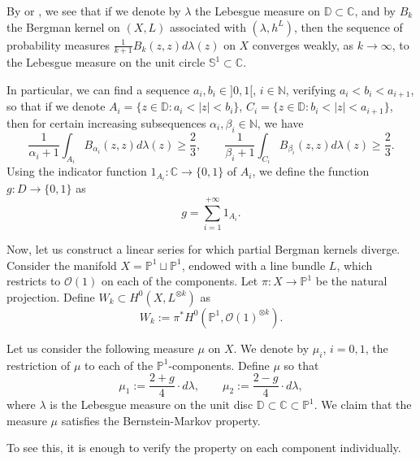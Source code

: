\documentclass[12pt]{article}
\numberwithin{equation}{section}
\theoremstyle{theorem}
\theoremstyle{definition}
\theoremstyle{remark}
\newcommand{\comp}{\mathbb{C}}
\newcommand{\nat}{\mathbb{N}}
\begin{document}
	By \cite{BloomLeven1} or \cite{BerBoucNys}, we see that if we denote by $\lambda$ the Lebesgue measure on $\mathbb{D} \subset \comp$, and by $B_k$ the Bergman kernel on $(X, L)$ associated with $(\lambda, h^L)$, then the sequence of probability measures $\frac{1}{k + 1} B_k(z,z) d \lambda(z)$ on $X$ converges weakly, as $k \to \infty$, to the Lebesgue measure on the unit circle $\mathbb{S}^1 \subset \comp$.
	\par 
	In particular, we can find a sequence $a_i, b_i \in ]0, 1[$, $i \in \nat$, verifying $a_i < b_i < a_{i + 1}$, so that if we denote $A_i = \{ z \in \mathbb{D}: a_i < |z| < b_i \}$, $C_i = \{ z \in \mathbb{D}: b_i < |z| < a_{i + 1} \}$, then for certain increasing subsequences $\alpha_i, \beta_i \in \nat$, we have
	\begin{equation}
		\frac{1}{\alpha_i + 1}
		\int_{A_i} B_{\alpha_i}(z,z) d \lambda(z) \geq \frac{2}{3},
		\qquad 
		\frac{1}{\beta_i + 1}
		\int_{C_i} B_{\beta_i}(z,z) d \lambda(z) \geq \frac{2}{3}.
	\end{equation}
	Using the indicator function $1_{A_i} : \comp \to \{0, 1\}$ of $A_i$, we define the function $g : D \to \{0, 1\}$ as 
	\begin{equation}
		g = \sum_{i = 1}^{+\infty} 1_{A_i}.
	\end{equation}
	\par 
	Now, let us construct a linear series for which partial Bergman kernels diverge.
	Consider the manifold $X = \mathbb{P}^1 \sqcup \mathbb{P}^1$, endowed with a line bundle $L$, which restricts to $\mathscr{O}(1)$ on each of the components.
	Let $\pi : X \to \mathbb{P}^1$ be the natural projection.
	Define $W_k \subset H^0(X, L^{\otimes k})$ as
	\begin{equation}\label{eq_pull_bc_prj_space}
		W_k := \pi^* H^0(\mathbb{P}^1, \mathscr{O}(1)^{\otimes k}).
	\end{equation}
	\par 
	Let us consider the following measure $\mu$ on $X$.
	We denote by $\mu_i$, $i = 0, 1$, the restriction of $\mu$ to each of the $\mathbb{P}^1$-components.
	Define $\mu$ so that 
	\begin{equation}
		\mu_1 := \frac{2 + g}{4} \cdot d \lambda, \qquad \mu_2 := \frac{2 - g}{4} \cdot d \lambda,
	\end{equation}
	where $\lambda$ is the Lebesgue measure on the unit disc $\mathbb{D} \subset \comp \subset \mathbb{P}^1$.
	We claim that the measure $\mu$ satisfies the Bernstein-Markov property.
	\par 
	To see this, it is enough to verify the property on each component individually. 
\end{document}
